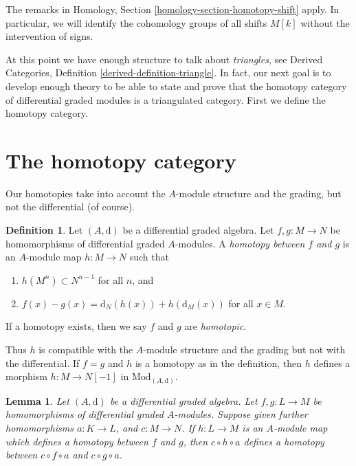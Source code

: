 \documentclass{stacks-project}
\theoremstyle{plain}
\newtheorem{lemma}[subsection]{Lemma}
\theoremstyle{definition}
\newtheorem{definition}[subsection]{Definition}
\theoremstyle{remark}
\numberwithin{equation}{subsection}
\begin{document}
\medskip\noindent
The remarks in Homology, Section \ref{homology-section-homotopy-shift} apply.
In particular, we will identify the cohomology groups of all shifts
$M[k]$ without the intervention of signs.

\medskip\noindent
At this point we have enough structure to talk about {\it triangles},
see Derived Categories, Definition \ref{derived-definition-triangle}.
In fact, our next goal is to develop enough theory to be able to
state and prove that the homotopy category of differential graded
modules is a triangulated category. First we define the homotopy category.






\section{The homotopy category}
\label{section-homotopy}

\noindent
Our homotopies take into account the $A$-module structure and the
grading, but not the differential (of course).

\begin{definition}
\label{definition-homotopy}
Let $(A, \text{d})$ be a differential graded algebra. Let
$f, g : M \to N$ be homomorphisms of differential graded $A$-modules.
A {\it homotopy between $f$ and $g$} is an $A$-module map $h : M \to N$
such that
\begin{enumerate}
\item $h(M^n) \subset N^{n - 1}$ for all $n$, and
\item $f(x) - g(x) = \text{d}_N(h(x)) + h(\text{d}_M(x))$ for
all $x \in M$.
\end{enumerate}
If a homotopy exists, then we say $f$ and $g$ are {\it homotopic}.
\end{definition}

\noindent
Thus $h$ is compatible with the $A$-module structure and the grading
but not with the differential. If $f = g$ and $h$ is a homotopy
as in the definition, then $h$ defines a morphism $h : M \to N[-1]$
in $\text{Mod}_{(A, \text{d})}$.

\begin{lemma}
\label{lemma-compose-homotopy}
Let $(A, \text{d})$ be a differential graded algebra.
Let $f, g : L \to M$ be homomorphisms of differential graded $A$-modules.
Suppose given further homomorphisms $a : K \to L$, and $c : M \to N$.
If $h : L \to M$ is an $A$-module map which defines a homotopy between
$f$ and $g$, then $c \circ h \circ a$ defines a homotopy between
$c \circ f \circ a$ and $c \circ g \circ a$.
\end{lemma}
\end{document}
